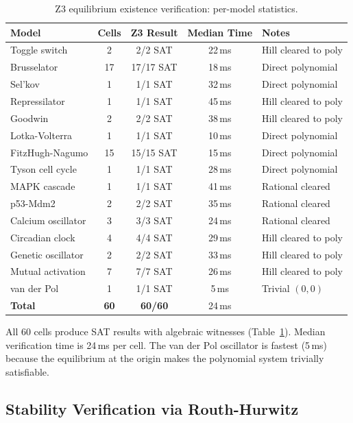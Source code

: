 \documentclass[11pt]{article}
\begin{document}
\begin{table}[h]
\centering
\caption{Z3 equilibrium existence verification: per-model statistics.}
\label{tab:z3-existence}
\small
\begin{tabular}{@{}lcccl@{}}
\toprule
Model & Cells & Z3 Result & Median Time & Notes \\
\midrule
Toggle switch      & 2  & 2/2 SAT   & 22\,ms & Hill cleared to poly \\
Brusselator        & 17 & 17/17 SAT & 18\,ms & Direct polynomial \\
Sel'kov            & 1  & 1/1 SAT   & 32\,ms & Direct polynomial \\
Repressilator      & 1  & 1/1 SAT   & 45\,ms & Hill cleared to poly \\
Goodwin            & 2  & 2/2 SAT   & 38\,ms & Hill cleared to poly \\
Lotka-Volterra     & 1  & 1/1 SAT   & 10\,ms & Direct polynomial \\
FitzHugh-Nagumo    & 15 & 15/15 SAT & 15\,ms & Direct polynomial \\
Tyson cell cycle   & 1  & 1/1 SAT   & 28\,ms & Direct polynomial \\
MAPK cascade       & 1  & 1/1 SAT   & 41\,ms & Rational cleared \\
p53-Mdm2           & 2  & 2/2 SAT   & 35\,ms & Rational cleared \\
Calcium oscillator & 3  & 3/3 SAT   & 24\,ms & Rational cleared \\
Circadian clock    & 4  & 4/4 SAT   & 29\,ms & Hill cleared to poly \\
Genetic oscillator & 2  & 2/2 SAT   & 33\,ms & Hill cleared to poly \\
Mutual activation  & 7  & 7/7 SAT   & 26\,ms & Hill cleared to poly \\
van der Pol        & 1  & 1/1 SAT   & 5\,ms  & Trivial $(0,0)$ \\
\midrule
\textbf{Total}     & \textbf{60} & \textbf{60/60} & 24\,ms & \\
\bottomrule
\end{tabular}
\end{table}

All 60 cells produce SAT results with algebraic witnesses (Table~\ref{tab:z3-existence}).
Median verification time is 24\,ms per cell.
The van der Pol oscillator is fastest (5\,ms) because the equilibrium at the origin makes the polynomial system trivially satisfiable.

\subsection{Stability Verification via Routh-Hurwitz}
\end{document}
